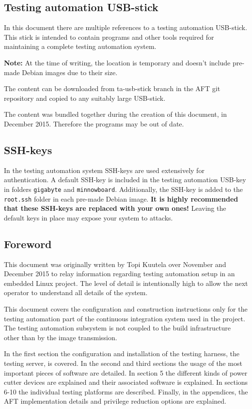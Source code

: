 \documentclass[a4paper,11pt]{article}
\newcommand{\note}{\textbf{Note: }}
\newcommand{\cmd}[1]{\texttt{#1}}
\begin{document}
\subsection{Testing automation USB-stick}
In this document there are multiple references to a testing automation USB-stick. This stick is intended to contain programs and other tools required for maintaining a complete testing automation system.

\note{At the time of writing, the location is temporary and doesn't include pre-made Debian images due to their size.}

The content can be downloaded from ta-usb-stick branch in the AFT git repository and copied to any suitably large USB-stick.

The content was bundled together during the creation of this document, in December 2015. Therefore the programs may be out of date.

\subsection{SSH-keys}
In the testing automation system SSH-keys are used extensively for authentication. A default SSH-key is included in the testing automation USB-key in folders \cmd{gigabyte} and \cmd{minnowboard}. Additionally, the SSH-key is added to the \cmd{\/root\/.ssh} folder in each pre-made Debian image. \textbf{It is highly recommended that these SSH-keys are replaced with your own ones!} Leaving the default keys in place may expose your system to attacks.

\subsection{Foreword}
This document was originally written by Topi Kuutela over November and December 2015 to relay information regarding testing automation setup in an embedded Linux project. The level of detail is intentionally high to allow the next operator to understand all details of the system. 

This document covers the configuration and construction instructions only for the testing automation part of the continuous integration system used in the project. The testing automation subsystem is not coupled to the build infrastructure other than by the image transmission.

In the first section the configuration and installation of the testing harness, the testing server, is covered. In the second and third sections the usage of the most important pieces of software are detailed. In section 5 the different kinds of power cutter devices are explained and their associated software is explained. In sections 6-10 the individual testing platforms are described. Finally, in the appendices, the AFT implementation details and privilege reduction options are explained.
\end{document}

